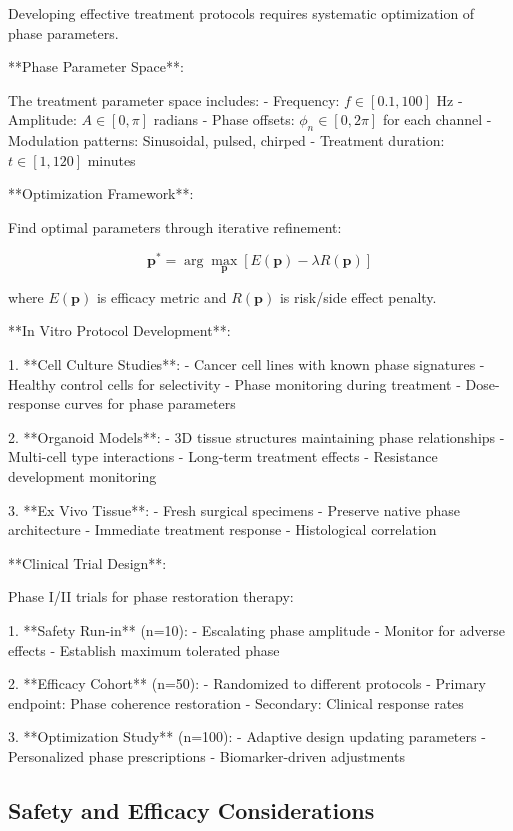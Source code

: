 \documentclass[12pt,a4paper]{report}
\begin{document}
Developing effective treatment protocols requires systematic optimization of phase parameters.

**Phase Parameter Space**:

The treatment parameter space includes:
- Frequency: $f \in [0.1, 100]$ Hz
- Amplitude: $A \in [0, \pi]$ radians
- Phase offsets: $\phi_n \in [0, 2\pi]$ for each channel
- Modulation patterns: Sinusoidal, pulsed, chirped
- Treatment duration: $t \in [1, 120]$ minutes

**Optimization Framework**:

Find optimal parameters through iterative refinement:

\begin{equation}
\mathbf{p}^* = \arg\max_{\mathbf{p}} \left[ E(\mathbf{p}) - \lambda R(\mathbf{p}) \right]
\end{equation}

where $E(\mathbf{p})$ is efficacy metric and $R(\mathbf{p})$ is risk/side effect penalty.

**In Vitro Protocol Development**:

1. **Cell Culture Studies**:
   - Cancer cell lines with known phase signatures
   - Healthy control cells for selectivity
   - Phase monitoring during treatment
   - Dose-response curves for phase parameters

2. **Organoid Models**:
   - 3D tissue structures maintaining phase relationships
   - Multi-cell type interactions
   - Long-term treatment effects
   - Resistance development monitoring

3. **Ex Vivo Tissue**:
   - Fresh surgical specimens
   - Preserve native phase architecture
   - Immediate treatment response
   - Histological correlation

**Clinical Trial Design**:

Phase I/II trials for phase restoration therapy:

1. **Safety Run-in** (n=10):
   - Escalating phase amplitude
   - Monitor for adverse effects
   - Establish maximum tolerated phase

2. **Efficacy Cohort** (n=50):
   - Randomized to different protocols
   - Primary endpoint: Phase coherence restoration
   - Secondary: Clinical response rates

3. **Optimization Study** (n=100):
   - Adaptive design updating parameters
   - Personalized phase prescriptions
   - Biomarker-driven adjustments

\subsection{Safety and Efficacy Considerations}
\end{document}
